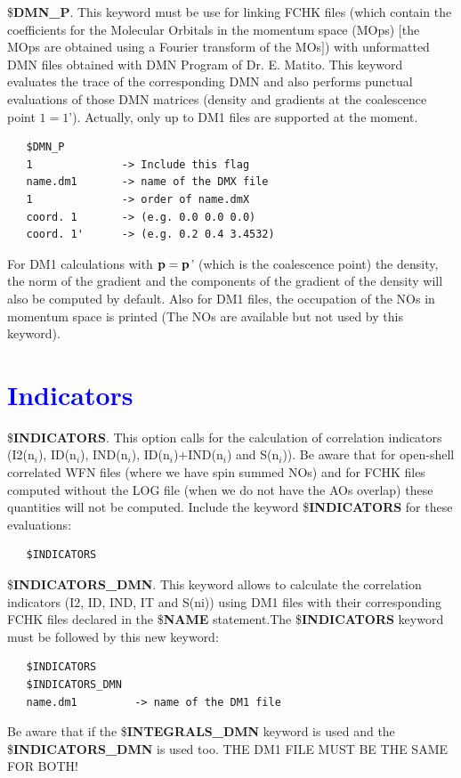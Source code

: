 \documentclass[10pt,a4paper]{article}
\newcommand{\tbl}[1]{{\textcolor{blue}{#1}}}
\begin{document}
\newline
\newline
\noindent \$\textbf{DMN\_P}. This keyword must be use for linking FCHK files (which contain the coefficients for the Molecular Orbitals in the momentum space (MOps) $[$the MOps are obtained using a Fourier transform of the MOs$]$) with unformatted DMN files obtained with DMN Program of Dr. E. Matito. This keyword evaluates the trace of the corresponding DMN and also performs punctual evaluations of those DMN matrices (density and gradients at the coalescence point $1=1$'). Actually, only up to DM1 files are supported at the moment.
\begin{verbatim}
   $DMN_P
   1              -> Include this flag
   name.dm1       -> name of the DMX file
   1              -> order of name.dmX
   coord. 1       -> (e.g. 0.0 0.0 0.0)
   coord. 1'      -> (e.g. 0.2 0.4 3.4532)
\end{verbatim}
For DM1 calculations with ${\bf p} ={\bf p}$' (which is the coalescence point) the density, the norm of the gradient and the components of the gradient of the density will also be computed by default. Also for DM1 files, the occupation of the NOs in momentum space is printed (The NOs are available but not used by this keyword). 
\newline
\section{\tbl{\textbf{Indicators}}}
\noindent \$\textbf{INDICATORS}. This option calls for the calculation of correlation indicators (I2(n$_i$), ID(n$_i$), IND(n$_i$), ID(n$_i$)$+$IND(n$_i$) and S(n$_i$)). Be aware that for open-shell correlated WFN files (where we have spin summed NOs) and for FCHK files computed without the LOG file (when we do not have the AOs overlap) these quantities will not be computed. Include the keyword \$\textbf{INDICATORS} for these evaluations: \newline
\begin{verbatim}
   $INDICATORS
\end{verbatim}
\noindent \$\textbf{INDICATORS\_DMN}. This keyword allows to calculate the correlation indicators (I2, ID, IND, IT and S(ni)) using DM1 files with their corresponding FCHK files declared in the \$\textbf{NAME} statement.\newline The \$\textbf{INDICATORS} keyword must be followed by this new keyword:
\begin{verbatim}
   $INDICATORS
   $INDICATORS_DMN
   name.dm1         -> name of the DM1 file
\end{verbatim}
\noindent Be aware that if the \$\textbf{INTEGRALS\_DMN} keyword is used and the \newline\$\textbf{INDICATORS\_DMN} is used too. THE DM1 FILE MUST BE THE SAME FOR BOTH!   
\newline
\newline
\end{document}
